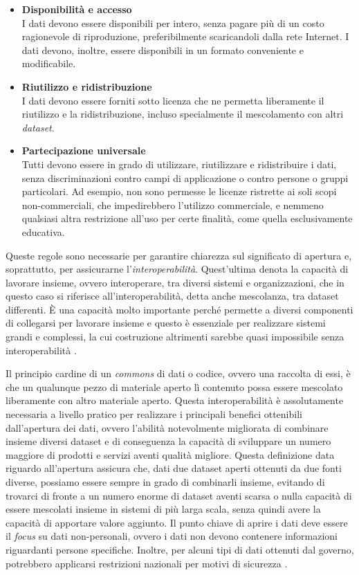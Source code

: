 \begin{itemize}
    \item \textbf{Disponibilità e accesso}\\
    I dati devono essere disponibili per intero, senza pagare più di un costo ragionevole di riproduzione, preferibilmente scaricandoli dalla rete Internet. I dati devono, inoltre, essere disponibili in un formato conveniente e modificabile.
    \item \textbf{Riutilizzo e ridistribuzione}\\
    I dati devono essere forniti sotto licenza che ne permetta liberamente il riutilizzo e la ridistribuzione, incluso specialmente il mescolamento con altri \textit{dataset}.
    \item \textbf{Partecipazione universale}\\
    Tutti devono essere in grado di utilizzare, riutilizzare e ridistribuire i dati, senza discriminazioni contro campi di applicazione o contro persone o gruppi particolari. Ad esempio, non sono permesse le licenze ristrette ai soli scopi non-commerciali, che impedirebbero l'utilizzo commerciale, e nemmeno qualsiasi altra restrizione all'uso per certe finalità, come quella esclusivamente educativa.
\end{itemize}

Queste regole sono necessarie per garantire chiarezza sul significato di apertura e, soprattutto, per assicurarne l'\textit{interoperabilità}. Quest'ultima denota la capacità di lavorare insieme, ovvero interoperare, tra diversi sistemi e organizzazioni, che in questo caso si riferisce all'interoperabilità, detta anche mescolanza, tra dataset differenti. \`E una capacità molto importante perché permette a diversi componenti di collegarsi per lavorare insieme e questo è essenziale per realizzare sistemi grandi e complessi, la cui costruzione altrimenti sarebbe quasi impossibile senza interoperabilità \cite{OpenDefinition_Full}.

Il principio cardine di un \textit{commons} di dati o codice, ovvero una raccolta di essi, è che un qualunque pezzo di materiale aperto lì contenuto possa essere mescolato liberamente con altro materiale aperto. Questa interoperabilità è assolutamente necessaria a livello pratico per realizzare i principali benefici ottenibili dall'apertura dei dati, ovvero l'abilità notevolmente migliorata di combinare insieme diversi dataset e di conseguenza la capacità di sviluppare un numero maggiore di prodotti e servizi aventi qualità migliore. Questa definizione data riguardo all'apertura assicura che, dati due dataset aperti ottenuti da due fonti diverse, possiamo essere sempre in grado di combinarli insieme, evitando di trovarci di fronte a un numero enorme di dataset aventi scarsa o nulla capacità di essere mescolati insieme in sistemi di più larga scala, senza quindi avere la capacità di apportare valore aggiunto. Il punto chiave di aprire i dati deve essere il \textit{focus} su dati non-personali, ovvero i dati non devono contenere informazioni riguardanti persone specifiche. Inoltre, per alcuni tipi di dati ottenuti dal governo, potrebbero applicarsi restrizioni nazionali per motivi di sicurezza \cite{OpenDataHandbook_WhyOpenData}.

